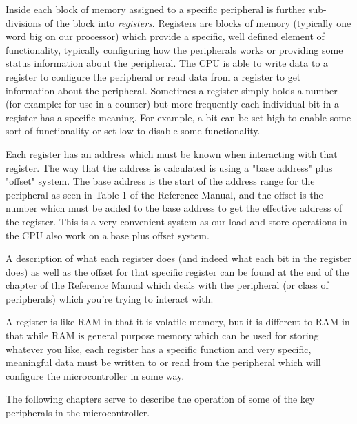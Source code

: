 Inside each block of memory assigned to a specific peripheral is further sub-divisions of the block into \emph{registers}. Registers are blocks of memory (typically one word big on our processor) which provide a specific, well defined element of functionality, typically configuring how the peripherals works or providing some status information about the peripheral. The CPU is able to write data to a register to configure the peripheral or read data from a register to get information about the peripheral. Sometimes a register simply holds a number (for example: for use in a counter) but more frequently each individual bit in a register has a specific meaning. For example, a bit can be set high to enable some sort of functionality or set low to disable some functionality. 

Each register has an address which must be known when interacting with that register. The way that the address is calculated is using a "base address" plus "offset" system. The base address is the start of the address range for the peripheral as seen in Table 1 of the Reference Manual, and the offset is the number which must be added to the base address to get the effective address of the register. This is a very convenient system as our load and store operations in the CPU also work on a base plus offset system. 

A description of what each register does (and indeed what each bit in the register does) as well as the offset for that specific register can be found at the end of the chapter of the Reference Manual which deals with the peripheral (or class of peripherals) which you're trying to interact with. 

A register is like RAM in that it is volatile memory, but it is different to RAM in that while RAM is general purpose memory which can be used for storing whatever you like, each register has a specific function and very specific, meaningful data must be written to or read from the peripheral which will configure the microcontroller in some way.

The following chapters serve to describe the operation of some of the key peripherals in the microcontroller.

